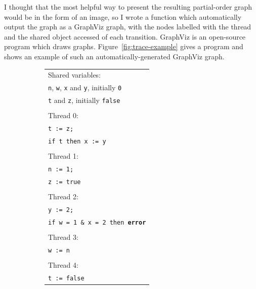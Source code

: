 \documentclass[12pt,a4paper,twoside,openright]{report}
\begin{document}
I thought that the most helpful way to
present the resulting partial-order
graph would be in the form of an
image, so I wrote a function which
automatically output the graph as
a GraphViz graph, with the nodes
labelled with the thread and the
shared object accessed of each transition.
GraphViz is an open-source program which
draws graphs.
Figure~\ref{fig:trace-example} gives a program
and shows an example of such an
automatically-generated GraphViz graph.

\begin{figure}
	\centering
	\begin{subfigure}{0.5\textwidth}
		\centering
		\begin{tabular}{l}
			Shared variables: \\
			\qquad \texttt{n}, \texttt{w},
			\texttt{x} and \texttt{y},
			initially \texttt{0} \\
			\qquad \texttt{t} and \texttt{z},
			initially \texttt{false} \\
			\\
			Thread 0: \\
			\qquad \texttt{t := z;} \\
			\qquad \texttt{if t then x := y} \\
			\\
			Thread 1: \\
			\qquad \texttt{n := 1;} \\
			\qquad \texttt{z := true} \\
			\\
			Thread 2: \\
			\qquad \texttt{y := 2;} \\
			\qquad \texttt{if w = 1 \& x = 2 then \textbf{error}} \\
			\\
			Thread 3: \\
			\qquad \texttt{w := n} \\
			\\
			Thread 4: \\
			\qquad \texttt{t := false} \\
		\end{tabular}
	\end{subfigure}%
	\begin{subfigure}{0.5\textwidth}
		\centering

\end{subfigure}
\end{figure}
\end{document}

